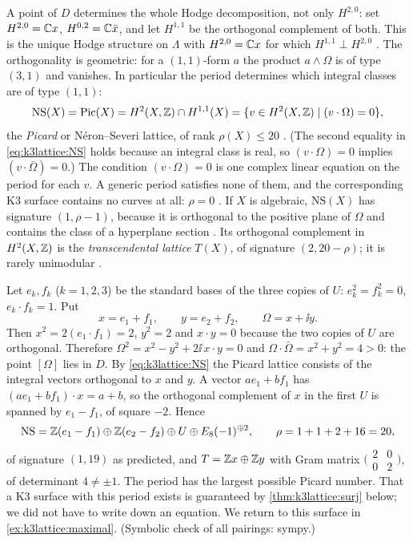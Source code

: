 A point of $D$ determines the whole Hodge decomposition,
not only $H^{2,0}$: set $H^{2,0}=\mathbb{C} x$, $H^{0,2}=\mathbb{C}\bar x$, and let $H^{1,1}$ be the
orthogonal complement of both. This is the unique Hodge structure on $\Lambda$ with
$H^{2,0}=\mathbb{C} x$ for which $H^{1,1}\perp H^{2,0}$ .
The orthogonality is geometric: for a $(1,1)$-form $a$ the product $a\wedge\Omega$ is of type
$(3,1)$ and vanishes. In particular the period determines which integral classes are of type
$(1,1)$:
\begin{equation}\label{eq:k3lattice:NS}
 \mathrm{NS}(X)=\mathrm{Pic}(X)=H^2(X,\mathbb{Z})\cap H^{1,1}(X)
 =\{v\in H^2(X,\mathbb{Z})\mid(v\cdot\Omega)=0\} ,
\end{equation}
the \emph{Picard} or Néron--Severi lattice, of rank $\rho(X)\le20$ . (The second equality in \eqref{eq:k3lattice:NS} holds because an
integral class is real, so $(v\cdot\Omega)=0$ implies $(v\cdot\bar\Omega)=0$.) The condition
$(v\cdot\Omega)=0$ is one complex linear equation on the period for each $v$. A generic
period satisfies none of them, and the corresponding K3 surface contains no curves at all:
$\rho=0$ . If $X$ is algebraic, $\mathrm{NS}(X)$ has signature
$(1,\rho-1)$, because it is orthogonal to the positive plane of $\Omega$ and contains the
class of a hyperplane section . Its orthogonal complement
in $H^2(X,\mathbb{Z})$ is the \emph{transcendental lattice} $T(X)$, of
signature $(2,20-\rho)$; it is rarely unimodular .

\begin{example}[A period point with $\rho=20$]\label{ex:k3lattice:rho20}
Let $e_k,f_k$ ($k=1,2,3$) be the standard bases of the three copies of $U$:
$e_k^2=f_k^2=0$, $e_k\cdot f_k=1$. Put
\[
 x=e_1+f_1,\qquad y=e_2+f_2,\qquad \Omega=x+\ii y .
\]
Then $x^2=2(e_1\cdot f_1)=2$, $y^2=2$ and $x\cdot y=0$ because the two copies of $U$ are
orthogonal. Therefore $\Omega^2=x^2-y^2+2\ii\,x\cdot y=0$ and
$\Omega\cdot\bar\Omega=x^2+y^2=4>0$: the point $[\Omega]$ lies in $D$. By
\eqref{eq:k3lattice:NS} the Picard lattice consists of the integral vectors orthogonal to $x$
and $y$. A vector $ae_1+bf_1$ has $(ae_1+bf_1)\cdot x=a+b$, so the orthogonal complement of
$x$ in the first $U$ is spanned by $e_1-f_1$, of square $-2$. Hence
\[
 \mathrm{NS}=\mathbb{Z}(e_1-f_1)\oplus\mathbb{Z}(e_2-f_2)\oplus U\oplus E_8(-1)^{\oplus2},\qquad
 \rho=1+1+2+16=20,
\]
of signature $(1,19)$ as predicted, and $T=\mathbb{Z} x\oplus\mathbb{Z} y$ with Gram matrix
$\bigl(\begin{smallmatrix}2&0\\0&2\end{smallmatrix}\bigr)$, of determinant $4\ne\pm1$. The
period has the largest possible Picard number. That a K3 surface with this period exists is
guaranteed by \cref{thm:k3lattice:surj} below; we did not have to write down an equation. We
return to this surface in \cref{ex:k3lattice:maximal}. (Symbolic check of all pairings:
sympy.)
\end{example}


